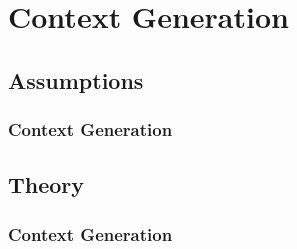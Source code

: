 \documentclass[11pt]{beamer}
\begin{document}




\AtBeginSection[]
{
\begin{frame}{}
    \tableofcontents[sections={\thesection}]
\end{frame}
}


\section{Context Generation}


\subsection{Assumptions}


\begin{frame}

\frametitle{Context Generation}
\framesubtitle{}

\end{frame}


\subsection{Theory}


\begin{frame}

\frametitle{Context Generation}
\framesubtitle{}

\end{frame}
\end{document}
